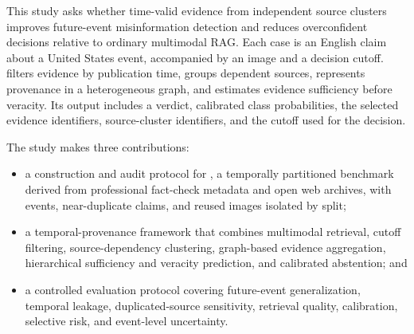 This study asks whether time-valid evidence from independent source clusters improves future-event misinformation detection and reduces overconfident decisions relative to ordinary multimodal RAG. Each case is an English claim about a United States event, accompanied by an image and a decision cutoff. \systemname{} filters evidence by publication time, groups dependent sources, represents provenance in a heterogeneous graph, and estimates evidence sufficiency before veracity. Its output includes a verdict, calibrated class probabilities, the selected evidence identifiers, source-cluster identifiers, and the cutoff used for the decision.

The study makes three contributions:
\begin{itemize}
    \item a construction and audit protocol for \datasetname{}, a temporally partitioned benchmark derived from professional fact-check metadata and open web archives, with events, near-duplicate claims, and reused images isolated by split;
    \item a temporal-provenance framework that combines multimodal retrieval, cutoff filtering, source-dependency clustering, graph-based evidence aggregation, hierarchical sufficiency and veracity prediction, and calibrated abstention; and
    \item a controlled evaluation protocol covering future-event generalization, temporal leakage, duplicated-source sensitivity, retrieval quality, calibration, selective risk, and event-level uncertainty.
\end{itemize}

